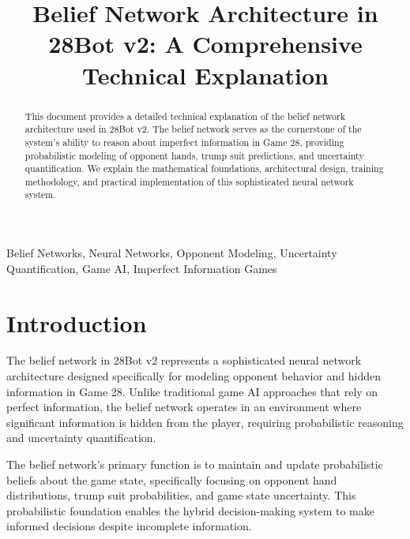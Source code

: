 \documentclass[conference]{IEEEtran}
\begin{document}
\title{Belief Network Architecture in 28Bot v2: A Comprehensive Technical Explanation}

\author{
}

\maketitle

\begin{abstract}
This document provides a detailed technical explanation of the belief network architecture used in 28Bot v2. The belief network serves as the cornerstone of the system's ability to reason about imperfect information in Game 28, providing probabilistic modeling of opponent hands, trump suit predictions, and uncertainty quantification. We explain the mathematical foundations, architectural design, training methodology, and practical implementation of this sophisticated neural network system.
\end{abstract}

\begin{IEEEkeywords}
Belief Networks, Neural Networks, Opponent Modeling, Uncertainty Quantification, Game AI, Imperfect Information Games
\end{IEEEkeywords}

\section{Introduction}

The belief network in 28Bot v2 represents a sophisticated neural network architecture designed specifically for modeling opponent behavior and hidden information in Game 28. Unlike traditional game AI approaches that rely on perfect information, the belief network operates in an environment where significant information is hidden from the player, requiring probabilistic reasoning and uncertainty quantification.

The belief network's primary function is to maintain and update probabilistic beliefs about the game state, specifically focusing on opponent hand distributions, trump suit probabilities, and game state uncertainty. This probabilistic foundation enables the hybrid decision-making system to make informed decisions despite incomplete information.
\end{document}
